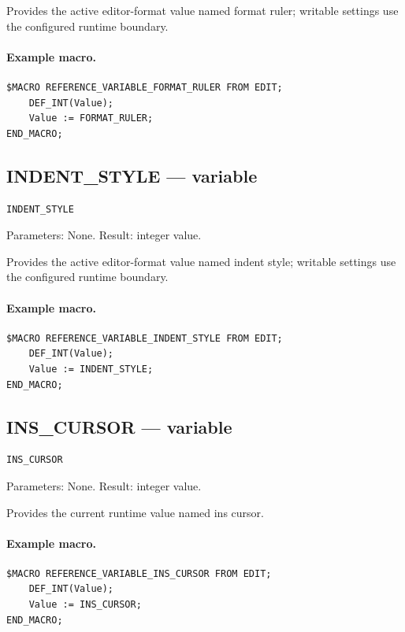 \documentclass[a4paper,10pt,twoside,openany]{book}
\begin{document}
Provides the active editor-format value named format ruler; writable settings use the configured runtime boundary.

\paragraph{Example macro.}
\begin{verbatim}
$MACRO REFERENCE_VARIABLE_FORMAT_RULER FROM EDIT;
    DEF_INT(Value);
    Value := FORMAT_RULER;
END_MACRO;
\end{verbatim}

\label{prim:variable-indent-style}
\subsection*{INDENT\_STYLE --- variable}
\begin{verbatim}
INDENT_STYLE
\end{verbatim}
Parameters: None. Result: integer value.

Provides the active editor-format value named indent style; writable settings use the configured runtime boundary.

\paragraph{Example macro.}
\begin{verbatim}
$MACRO REFERENCE_VARIABLE_INDENT_STYLE FROM EDIT;
    DEF_INT(Value);
    Value := INDENT_STYLE;
END_MACRO;
\end{verbatim}

\label{prim:variable-ins-cursor}
\subsection*{INS\_CURSOR --- variable}
\begin{verbatim}
INS_CURSOR
\end{verbatim}
Parameters: None. Result: integer value.

Provides the current runtime value named ins cursor.

\paragraph{Example macro.}
\begin{verbatim}
$MACRO REFERENCE_VARIABLE_INS_CURSOR FROM EDIT;
    DEF_INT(Value);
    Value := INS_CURSOR;
END_MACRO;
\end{verbatim}
\end{document}

